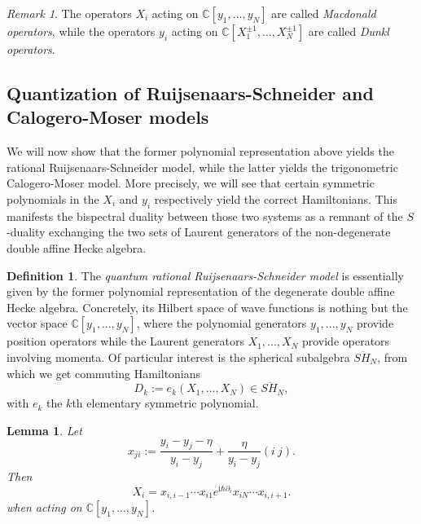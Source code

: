 \documentclass[11pt]{report}
\newtheorem{lemma}[theorem]{Lemma}
\theoremstyle{definition}
\newtheorem{definition}[theorem]{Definition}
\theoremstyle{remark}
\newtheorem*{remark}{Remark}
\theoremstyle{remark}
\newcommand{\C}{\mathbb{C}}
\newcommand{\I}{\mathrm{i}}
\begin{document}
\begin{remark}
The operators $X_i$ acting on $\C[y_1,...,y_N]$ are called \emph{Macdonald operators}, while the operators $y_i$ acting on $\C[X_1^{\pm 1},...,X_N^{\pm 1}]$ are called \emph{Dunkl operators}.
\end{remark}

\subsection{Quantization of Ruijsenaars-Schneider and Calogero-Moser models}

We will now show that the former polynomial representation above yields the rational Ruijsenaars-Schneider model, while the latter yields the trigonometric Calogero-Moser model. More precisely, we will see that certain symmetric polynomials in the $X_i$ and $y_i$ respectively yield the correct Hamiltonians. This manifests the bispectral duality between those two systems \cite{article:chalykh:2000} as a remnant of the $S$-duality exchanging the two sets of Laurent generators of the non-degenerate double affine Hecke algebra.

\begin{definition}
The \emph{quantum rational Ruijsenaars-Schneider model} is essentially given by the former polynomial representation of the degenerate double affine Hecke algebra. Concretely, its Hilbert space of wave functions is nothing but the vector space $\C[y_1,...,y_N]$, where the polynomial generators $y_1,...,y_N$ provide position operators while the Laurent generators $X_1,...,X_N$ provide operators involving momenta. Of particular interest is the spherical subalgebra $S\ddot H_N$, from which we get commuting Hamiltonians
\begin{equation*}
D_k := e_k(X_1,...,X_N) \in S\ddot H_N,
\end{equation*}
with $e_k$ the $k$th elementary symmetric polynomial.
\end{definition}

\begin{lemma}
Let
\begin{equation*}
x_{ji} := \frac{y_i-y_j-\eta}{y_i-y_j} + \frac{\eta}{y_i-y_j} (i \ j).
\end{equation*}
Then
\begin{equation*}
X_i = x_{i,i-1} \cdots x_{i1} e^{\I \hbar \partial_i} x_{iN} \cdots x_{i,i+1}.
\end{equation*}
when acting on $\C[y_1,...,y_N]$.
\end{lemma}
\end{document}
